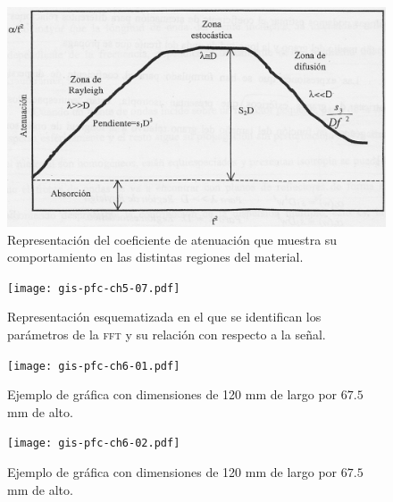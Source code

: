 \documentclass[a4paper,12pt]				{article}
\begin{document}
\begin{figure}
	\begin{center}
		\includegraphics{gis-pfc-ch5-06.jpg}
	\end{center}
	\caption[Comportamiento del coeficiente de
	atenuación]{Representación del coeficiente de atenuación que
	muestra su comportamiento en las distintas regiones del material.}
	\label{fig:losscoefficient}
\end{figure}

\begin{figure}
	\begin{center}
		\texttt{[image: gis-pfc-ch5-07.pdf]}
	\end{center}
	\caption[Parámetros del banco de filtros]{Representación
	esquematizada en el que se identifican los parámetros de la
	\textsc{fft} y su relación con respecto a la señal.}
	\label{fig:filter}
\end{figure}

% 
\begin{figure}
	\begin{center}
		\texttt{[image: gis-pfc-ch6-01.pdf]}
	\end{center}
	\caption[Ejemplo de gráfica]{Ejemplo de gráfica con dimensiones de
	120 mm de largo por $67.5$ mm de alto.}
	\label{fig:palmone}
\end{figure}

\clearpage

\begin{figure}
	\begin{center}
		\texttt{[image: gis-pfc-ch6-02.pdf]}
	\end{center}
	\caption[Ejemplo de gráfica]{Ejemplo de gráfica con dimensiones de
	120 mm de largo por $67.5$ mm de alto.}
\end{figure}
\end{document}
